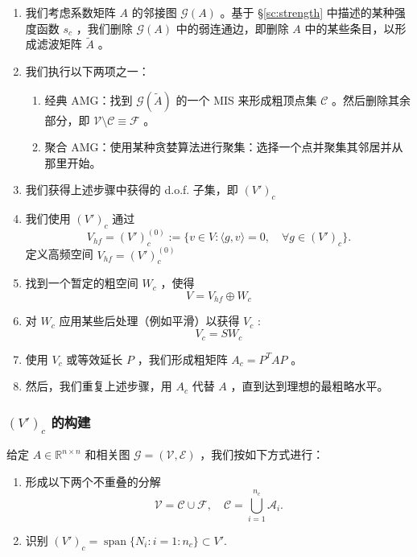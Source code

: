 \documentclass[12pt]{acta_2011xz}
\newcommand{\Span}{\ensuremath{\operatorname{span}}}
\newcommand{\dof}{\ensuremath{N}}
\begin{document}
   \begin{enumerate}

   \item   我们考虑系数矩阵    $A$    的邻接图    $\mathcal G(A)$    。基于    \S       \ref{sc:strength}    中描述的某种强度函数    $s_c$    ，我们删除    $\mathcal G(A)$    中的弱连通边，即删除    $A$    中的某些条目，以形成滤波矩阵    $\tilde A$    。   \item   我们执行以下两项之一：
   \begin{enumerate}      \item   经典 AMG：找到    $\mathcal G(\tilde A)$    的一个 MIS 来形成粗顶点集    $\mathcal C$    。然后删除其余部分，即    $\mathcal V\setminus\mathcal C\equiv\mathcal F$    。   \item   聚合 AMG：使用某种贪婪算法进行聚集：选择一个点并聚集其邻居并从那里开始。  \end{enumerate}      \item   我们获得上述步骤中获得的 d.o.f. 子集，即    $(V')_c$      \item   我们使用    $(V')_c$    通过 
   \begin{equation}
  \label{polarVhf}
V_{hf}=(V')_c^{(0)}:= \{ v\in V: \langle g, v\rangle=0, \quad \forall
g\in (V')_c  \} .
\end{equation}    定义高频空间    $V_{hf}=(V')_c^{(0)}$      \item   找到一个暂定的粗空间    $W_c$   ，使得 
   \begin{equation}
    \label{VhfWc}
V=V_{hf}\oplus W_c    
  \end{equation}      \item   对    $W_c$    应用某些后处理（例如平滑）以获得    $V_c$    :
   $$
V_c=SW_c
$$      \item   使用    $V_c$    或等效延长    $P$   ，我们形成粗矩阵    $A_c=P^TAP$    。   \item   然后，我们重复上述步骤，用    $A_c$    代替    $A$   ，直到达到理想的最粗略水平。
   \end{enumerate}     

   \subsubsection{   $(V')_c$    的构建  }    给定    $A\in \mathbb R^{n\times n}$    和相关图    $\mathcal G=(\mathcal V, \mathcal E)$    ，我们按如下方式进行：
   \begin{enumerate}[1.]

   \item   形成以下两个不重叠的分解
   $$
\mathcal V=\mathcal C\cup \mathcal F,\quad
\mathcal C = \bigcup_{i=1}^{n_c}\mathcal A_i.
$$      \item   识别    $ (V')_c=\Span \{ \dof_i:i=1:n_c \} \subset V'. $     \end{enumerate}     
\end{document}
